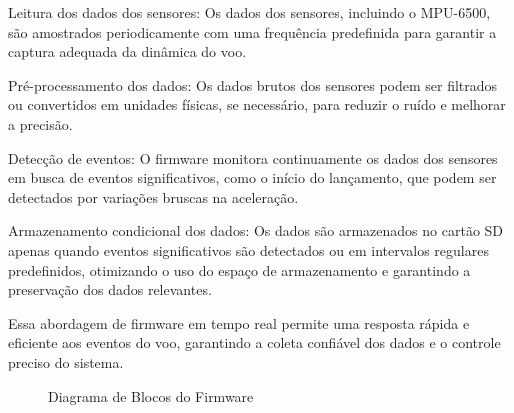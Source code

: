 Leitura dos dados dos sensores: Os dados dos sensores, incluindo o MPU-6500, são amostrados periodicamente com uma frequência predefinida para garantir a captura adequada da dinâmica do voo.

Pré-processamento dos dados: Os dados brutos dos sensores podem ser filtrados ou convertidos em unidades físicas, se necessário, para reduzir o ruído e melhorar a precisão.

Detecção de eventos: O firmware monitora continuamente os dados dos sensores em busca de eventos significativos, como o início do lançamento, que podem ser detectados por variações bruscas na aceleração.

Armazenamento condicional dos dados: Os dados são armazenados no cartão SD apenas quando eventos significativos são detectados ou em intervalos regulares predefinidos, otimizando o uso do espaço de armazenamento e garantindo a preservação dos dados relevantes.

Essa abordagem de firmware em tempo real permite uma resposta rápida e eficiente aos eventos do voo, garantindo a coleta confiável dos dados e o controle preciso do sistema.


\usetikzlibrary{arrows.meta}   %
\usetikzlibrary{positioning}   %

\begin{figure}[h!]
    \centering
    \caption{Diagrama de Blocos do Firmware}
    \label{fig:firmware_diagram}
\end{figure}


